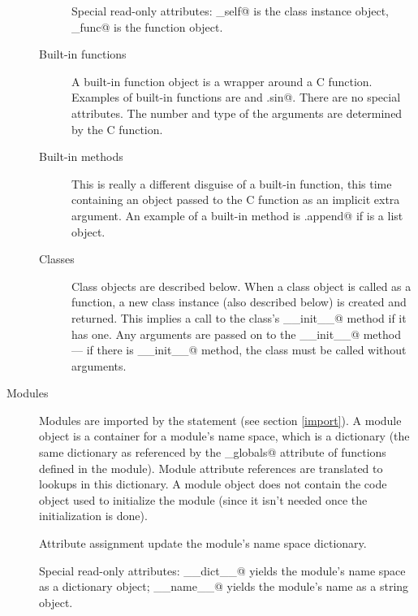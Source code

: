 \begin{description}
\begin{description}
Special read-only attributes: \verb@im_self@ is the class instance
object, \verb@im_func@ is the function object.

\item[Built-in functions]
A built-in function object is a wrapper around a C function.  Examples
of built-in functions are \verb@len@ and \verb@math.sin@.  There
are no special attributes.  The number and type of the arguments are
determined by the C function.

\item[Built-in methods]
This is really a different disguise of a built-in function, this time
containing an object passed to the C function as an implicit extra
argument.  An example of a built-in method is \verb@list.append@ if
\verb@list@ is a list object.

\item[Classes]
Class objects are described below.  When a class object is called as a
function, a new class instance (also described below) is created and
returned.  This implies a call to the class's \verb@__init__@ method
if it has one.  Any arguments are passed on to the \verb@__init__@
method --- if there is \verb@__init__@ method, the class must be called
without arguments.

\end{description}

\item[Modules]
Modules are imported by the \verb@import@ statement (see section
\ref{import}).  A module object is a container for a module's name
space, which is a dictionary (the same dictionary as referenced by the
\verb@func_globals@ attribute of functions defined in the module).
Module attribute references are translated to lookups in this
dictionary.  A module object does not contain the code object used to
initialize the module (since it isn't needed once the initialization
is done).

Attribute assignment update the module's name space dictionary.

Special read-only attributes: \verb@__dict__@ yields the module's name
space as a dictionary object; \verb@__name__@ yields the module's name
as a string object.


\end{description}
